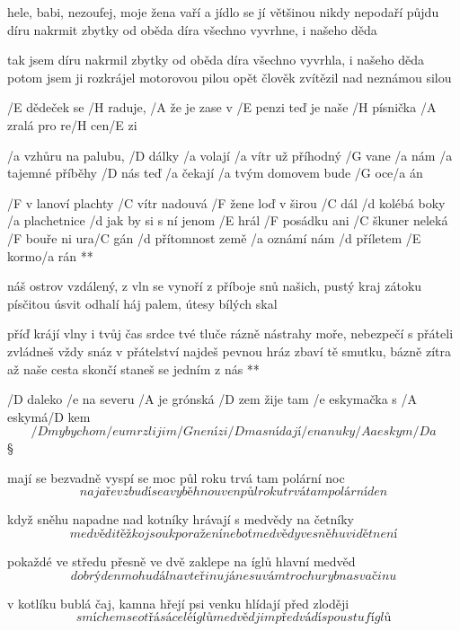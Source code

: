 hele, babi, nezoufej, moje žena vaří
a jídlo se jí většinou nikdy nepodaří
půjdu díru nakrmit zbytky od oběda
díra všechno vyvrhne, i našeho děda \s

tak jsem díru nakrmil zbytky od oběda
díra všechno vyvrhla, i našeho děda
potom jsem ji rozkrájel motorovou pilou
opět člověk zvítězil nad neznámou silou \s

/E dědeček se /H raduje, /A že je zase v /E penzi
teď je naše /H písnička /A zralá pro re/H cen/E zi \songgg




/a vzhůru na palubu, /D dálky /a volají
/a vítr už příhodný /G vane /a nám
/a tajemné příběhy /D nás teď /a čekají
/a tvým domovem bude /G oce/a án

\R  /F v lanoví plachty /C vítr nadouvá
    /F žene loď v širou /C dál
    /d kolébá boky /a plachetnice
    /d jak by si s ní jenom /E hrál
    /F posádku ani /C škuner neleká
    /F bouře ni ura/C gán
    /d přítomnost země /a oznámí nám
    /d příletem /E kormo/a rán **

náš ostrov vzdálený, z vln se vynoří
z příboje snů našich, pustý kraj
zátoku písčitou úsvit odhalí
háj palem, útesy bílých skal

\R  příď krájí vlny i tvůj čas
    srdce tvé tluče rázně
    nástrahy moře, nebezpečí
    s přáteli zvládneš vždy snáz
    v přátelství najdeš pevnou hráz
    zbaví tě smutku, bázně
    zítra až naše cesta skončí
    staneš se jedním z nás **




/D daleko /e na severu /A je grónská /D zem
žije tam /e eskymačka s /A eskymá/D kem
\[ /D my bychom /e umrzli jim /G není zi/D ma
snídají /e nanuky /A a eskym/D a \]\S

mají se bezvadně vyspí se moc
půl roku trvá tam polární noc
\[ na jaře vzbudí se a vyběhnou ven
půl roku trvá tam polární den \]\s

když sněhu napadne nad kotníky
hrávají s medvědy na četníky
\[ medvědi těžko jsou k poražení
neboť medvědy ve sněhu vidět není \]\s

pokaždé ve středu přesně ve dvě
zaklepe na íglů hlavní medvěd
\[ dobrý den mohu dál na vteřinu
já nesu vám trochu ryb na svačinu \]\s

v kotlíku bublá čaj, kamna hřejí
psi venku hlídají před zloději
\[ smíchem se otřásá celé íglů
medvěd jim předvádí spoustu fíglů \]\s

